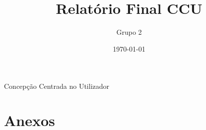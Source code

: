 \documentclass{report}
\title{Relatório Final CCU}
\author{Grupo 2}
\date{\today}
\begin{document}
\begin{acronym}
	 {Concepção Centrada no Utilizador}
\end{acronym}

\maketitle

\tableofcontents







%













\chapter{Anexos}


\end{document}
